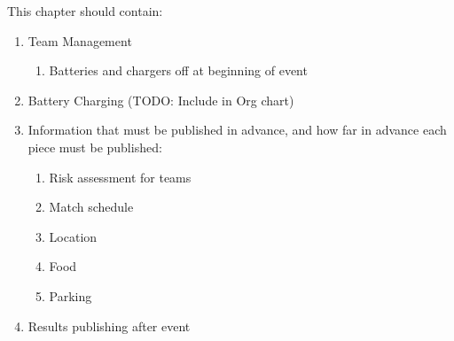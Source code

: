 This chapter should contain:
\begin{enumerate}

\item Team Management
  \begin{enumerate}
  \item Batteries and chargers off at beginning of event
  \end{enumerate}

\item Battery Charging (TODO: Include in Org chart)

\item Information that must be published in advance, and how far in advance each piece must be published:
  \begin{enumerate}
  \item Risk assessment for teams
  \item Match schedule
  \item Location
  \item Food
  \item Parking
  \end{enumerate}

\item Results publishing after event
\end{enumerate}
